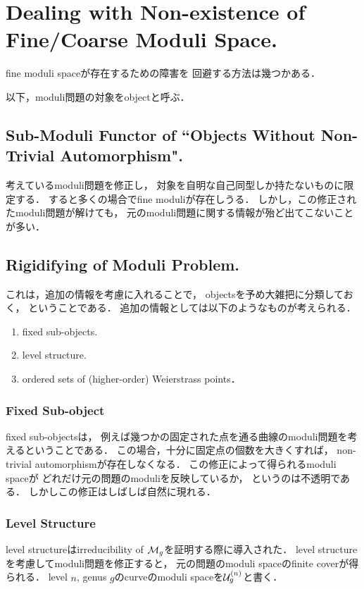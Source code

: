 \documentclass[a4paper]{jsarticle}
\begin{document}
\section{Dealing with Non-existence of Fine/Coarse Moduli Space.}
    fine moduli spaceが存在するための障害を
    回避する方法は幾つかある．
    
    以下，moduli問題の対象をobjectと呼ぶ．

    \subsection{Sub-Moduli Functor of ``Objects Without Non-Trivial Automorphism".}
    考えているmoduli問題を修正し，
    対象を自明な自己同型しか持たないものに限定する．
    すると多くの場合でfine moduliが存在しうる．
    しかし，この修正されたmoduli問題が解けても，
    元のmoduli問題に関する情報が殆ど出てこないことが多い．

    \subsection{Rigidifying of Moduli Problem.}
    これは，追加の情報を考慮に入れることで，
    objectsを予め大雑把に分類しておく，
    ということである．
    追加の情報としては以下のようなものが考えられる．
    \begin{enumerate}
        \item fixed sub-objects.
        \item level structure.
        \item ordered sets of (higher-order) Weierstrass points．
    \end{enumerate}

    \subsubsection{ Fixed Sub-object }
    fixed sub-objectsは，
    例えば幾つかの固定された点を通る曲線のmoduli問題を考えるということである．
    この場合，十分に固定点の個数を大きくすれば，
    non-trivial automorphismが存在しなくなる．
    この修正によって得られるmoduli spaceが
    どれだけ元の問題のmoduliを反映しているか，
    というのは不透明である．
    しかしこの修正はしばしば自然に現れる．

    \subsubsection{ Level Structure }
    level structureはirreducibility of $\mathcal{M}_g$を証明する際に導入された．
    level structureを考慮してmoduli問題を修正すると，
    元の問題のmoduli spaceのfinite coverが得られる．
    level $n$, genus $g$のcurveのmoduli spaceを$\mathcal{U}_g^{(n)}$と書く．
\end{document}
